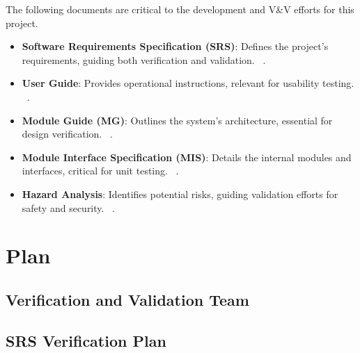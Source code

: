 \documentclass[12pt, titlepage]{article}
\begin{document}


The following documents are critical to the development and V\&V efforts for this project.

\begin{itemize}
    \item \textbf{Software Requirements Specification (SRS)}: Defines the project’s requirements, guiding both verification and validation. ~\citep{SRS}.
    \item \textbf{User Guide}: Provides operational instructions, relevant for usability testing. ~\citep{UserGuide}.
    \item \textbf{Module Guide (MG)}: Outlines the system’s architecture, essential for design verification. ~\citep{MG}.
    \item \textbf{Module Interface Specification (MIS)}: Details the internal modules and interfaces, critical for unit testing. ~\citep{MIS}.
    \item \textbf{Hazard Analysis}: Identifies potential risks, guiding validation efforts for safety and security. ~\citep{HazardAnalysis}.
\end{itemize}

\section{Plan}


\subsection{Verification and Validation Team}


\subsection{SRS Verification Plan}

\end{document}
